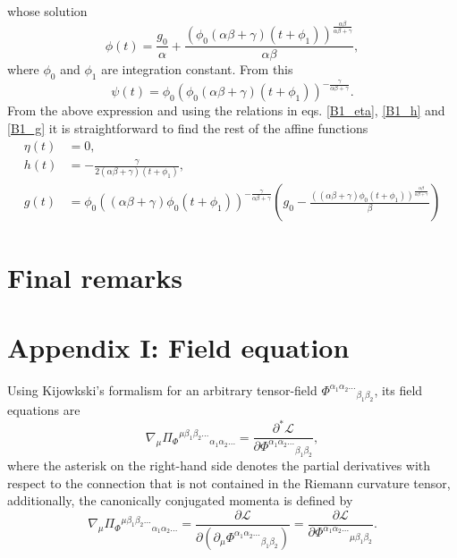 \documentclass{article}
\begin{document}
whose solution
\begin{equation}
    \phi(t) = \frac{g_0}{\alpha} + \frac{\left(\phi_0 \left(\alpha\beta + \gamma\right) \left(t +  \phi_1\right)\right)^{\frac{\alpha\beta}{\alpha\beta + \gamma}}}{\alpha\beta},
\end{equation}
where $\phi_0$ and $\phi_1$ are integration constant. From this
\begin{equation}
    \psi(t) = \phi_0 \left(\phi_0 \left(\alpha\beta + \gamma\right)\left(t + \phi_1\right)\right)^{-\frac{\gamma}{\alpha\beta + \gamma}}.
\end{equation}
From the above expression and using the relations in eqs. \eqref{B1_eta}, \eqref{B1_h} and \eqref{B1_g} it is straightforward to find the rest of the
affine functions
\begin{align}
    \eta(t) & = 0,\\
    h(t) & = - \frac{\gamma}{2\left(\alpha\beta + \gamma\right)\left(t + \phi_1\right)},\\
    g(t) & = \phi_0 \left(\left(\alpha\beta + \gamma\right)\phi_0 \left(t + \phi_1\right)\right)^{-\frac{\gamma}{\alpha\beta + \gamma}}
    \left(g_0 - \frac{\left(\left(\alpha\beta + \gamma\right)\phi_0\left(t + \phi_1\right)\right)^{\frac{\alpha\beta}{\alpha\beta + \gamma}}}{\beta}\right)
\end{align}

\section{Final remarks}
\label{sec: final_remarks}

\appendix

\section{Appendix I: Field equation}
\label{sec:Appendix_I}

Using Kijowkski's formalism for an arbitrary tensor-field $\Phi^{\alpha_1\alpha_2 ...}{}_{\beta_1\beta_2}$, its field equations are
\begin{equation}
    \nabla_\mu \Pi_{\Phi}{}^{\mu\beta_1\beta_2 ...}{}_{\alpha_1\alpha_2 ...}  = \frac{\partial^* \mathcal{L}}{\partial \Phi^{\alpha_1\alpha_2 ...}{}_{\beta_1\beta_2}},
\end{equation}
where the asterisk on the right-hand side denotes the partial derivatives with respect to the connection that is not
contained in the Riemann curvature tensor, additionally, the canonically conjugated momenta is defined by
\begin{equation}
    \nabla_\mu \Pi_{\Phi}{}^{\mu\beta_1\beta_2 ...}{}_{\alpha_1\alpha_2 ...}
    = \frac{\partial \mathcal{L}}{\partial \left(\partial_\mu \Phi^{\alpha_1\alpha_2 ...}{}_{\beta_1\beta_2}\right)} 
    = \frac{\partial \mathcal{L}}{\partial \Phi^{\alpha_1\alpha_2 ...}{}_{\mu\beta_1\beta_2}}.
\end{equation}
\end{document}
